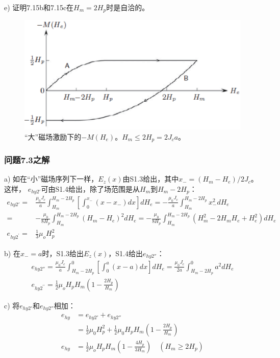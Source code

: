 e) 证明7.15b和7.15c在$H_m=2H_p$时是自洽的。

\begin{figure}[htbp]
	\centering
	\includegraphics[scale=0.7]{chpt7/figs/fig7.12.eps}
	\caption{“大”磁场激励下的$-M(H_e)$。$H_m\le 2H_p=2J_c a$。}
\end{figure}

\subsubsection{问题7.3之解}
a) 如在“小”磁场序列下一样，$E_z(x)$由S1.3给出，其中$x_-=(H_m-H_e)/2J_c$。这样，
$e_{hy2'}$可由S1.4给出，除了场范围是从$H_m$到$H_m-2H_p$：
\begin{align*}%
e_{hy2'}=&\frac{\mu_0 J_c}{a}\int_{H_m}^{H_m-2H_p}\left[\int_{0}^{x_-}(x-x_-)dx\right]dH_e=-\frac{\mu_0 J_c}{a}\int_{H_m}^{H_m-2H_p} x_-^2 dH_e\\
=&-\frac{\mu_0}{8H_p}\int_{H_m}^{H_m-2H_p}(H_m-H_e)^2 dH_e=-\frac{\mu_0}{8H_p}\int_{H_m}^{H_m-2H_p}(H_m^2-2H_mH_e+H_e^2) dH_e\\
e_{hy2^\prime}=&\frac{1}{3}\mu_oH_{p}^{2} \tag{7.16a}
\end{align*}

b) 在$x_-=a$时，S1.3给出$E_z(x)$，S1.4给出$e_{hy2''}$：
\begin{align*}%
e_{hy2''}=\frac{\mu_0 J_c}{a}\int_{H_m-2H_p}^{0}\left[\int_{0}^{a}(x-a)dx\right]dH_e=\frac{\mu_0J_c}{2a}\int_{H_m-2H_p}^{0}a^2 dH_e\\
e_{hy2^{\prime\prime}}=\frac{1}{2}\mu_oH_pH_m\left(1-\frac{2H_p}{H_m}\right) \tag{7.16b}
\end{align*}

c) 将$e_{hy2'}$和$e_{hy2''}$相加：
\begin{align*}%
e_{hy}&=e_{hy2'}+e_{hy2''}\\
&=\frac{1}{3}\mu_0 H_p^2 +\frac{1}{2}\mu_0H_p H_m\left(1-\frac{2H_p}{H_m}\right)\\
e_{hy}&=\frac{1}{2}\mu_oH_pH_m\left(1-\frac{4H_p}{3H_m}\right)  \quad   (H_m\geq 2H_p) \tag{7.14b}
\end{align*}

